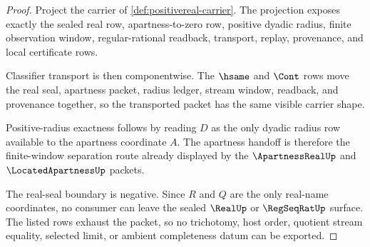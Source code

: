 \begin{proof}
Project the carrier of \autoref{def:positivereal-carrier}. The projection
exposes exactly the sealed real row, apartness-to-zero row, positive dyadic
radius, finite observation window, regular-rational readback, transport,
replay, provenance, and local certificate rows.

Classifier transport is then componentwise. The $\hsame$ and $\Cont$ rows move
the real seal, apartness packet, radius ledger, stream window, readback, and
provenance together, so the transported packet has the same visible carrier
shape.

Positive-radius exactness follows by reading $D$ as the only dyadic radius row
available to the apartness coordinate $A$. The apartness handoff is therefore
the finite-window separation route already displayed by the
$\ApartnessRealUp$ and $\LocatedApartnessUp$ packets.

The real-seal boundary is negative. Since $R$ and $Q$ are the only real-name
coordinates, no consumer can leave the sealed $\RealUp$ or $\RegSeqRatUp$
surface. The listed rows exhaust the packet, so no trichotomy, host order,
quotient stream equality, selected limit, or ambient completeness datum can be
exported.
\end{proof}

